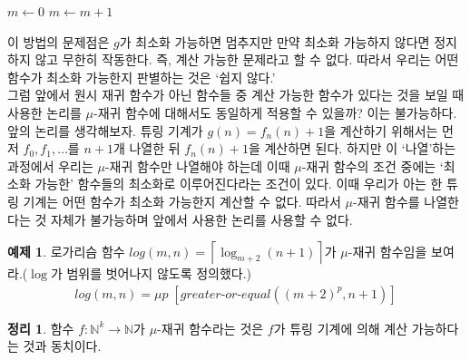 \documentclass[b5paper, 11pt]{book}
\theoremstyle{definition}
\newtheorem{thm}[defn]{정리}
\newtheorem{ex}[defn]{예제}
\begin{document}
\begin{algorithmic}
        \State $m \gets 0$
            \State $m \gets m+1$
        \EndWhile
\end{algorithmic}
이 방법의 문제점은 $g$가 최소화 가능하면 멈추지만 만약 최소화 가능하지 않다면 정지하지 않고 무한히 작동한다.
즉, 계산 가능한 문제라고 할 수 없다. 따라서 우리는 어떤 함수가 최소화 가능한지 판별하는 것은 `쉽지 않다.'\\
그럼 앞에서 원시 재귀 함수가 아닌 함수들 중 계산 가능한 함수가 있다는 것을 보일 때 사용한 논리를 $\mu$-재귀
함수에 대해서도 동일하게 적용할 수 있을까? 이는 불가능하다. 앞의 논리를 생각해보자. 튜링 기계가 
$g(n) = f_n(n) + 1$을 계산하기 위해서는 먼저 $f_0, f_1, \ldots$를 $n+1$개 나열한 뒤 $f_n(n) + 1$을 
계산하면 된다. 하지만 이 `나열'하는 과정에서 우리는 $\mu$-재귀 함수만 나열해야 하는데 이때 $\mu$-재귀 함수의
조건 중에는 `최소화 가능한' 함수들의 최소화로 이루어진다라는 조건이 있다. 이때 우리가 아는 한
튜링 기계는 어떤 함수가 최소화 가능한지 계산할 수 없다. 
따라서 $\mu$-재귀 함수를 나열한다는 것 자체가 불가능하며 앞에서 사용한 논리를 사용할 수 없다. 
\begin{ex}
    로가리슴 함수 $log(m,n) = \left\lceil \log_{m+2}(n+1)\right\rceil$가 $\mu$-재귀 함수임을
    보여라.($\log$가 범위를 벗어나지 않도록 정의했다.)
    \begin{align*}
        log(m,n) = \mu p \; [greater\text{-}or\text{-}equal((m+2)^p, n+1)]
    \end{align*}
\end{ex}
\begin{thm}
    함수 $f: \mathbb{N}^k \rightarrow \mathbb{N}$가 $\mu$-재귀 함수라는 것은
    $f$가 튜링 기계에 의해 계산 가능하다는 것과 동치이다.  
\end{thm}
\end{document}
